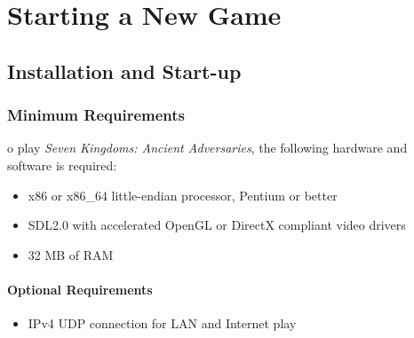 
\chapter{Starting a New Game}

\section{Installation and Start-up}


\subsection{Minimum Requirements}

o play \textit{Seven Kingdoms: Ancient Adversaries}, the following hardware and software is required:

\begin{itemize}
	\item x86 or x86\_64 little-endian processor, Pentium or better
	\item SDL2.0 with accelerated OpenGL or DirectX compliant video drivers
	\item 32 MB of RAM
\end{itemize}

\subsubsection{Optional Requirements}

\begin{itemize}
	\item IPv4 UDP connection for LAN and Internet play
\end{itemize}

